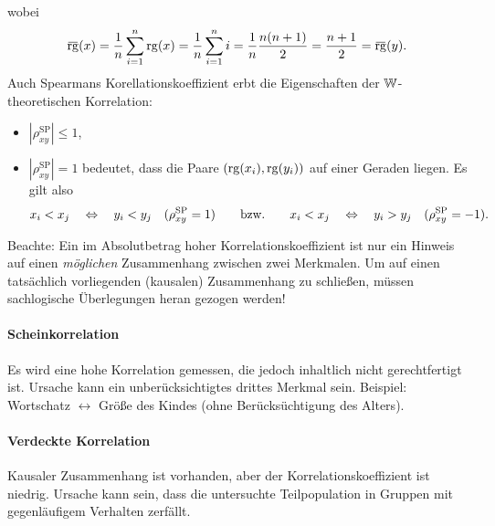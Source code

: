 wobei
\[ \obar{\rg}(x) = \rez{n} \sum_{i=1}^n \rg(x) = \rez{n} \sum_{i=1}^n i =
  \rez{n} \frac{n(n+1)}{2} = \frac{n+1}{2} = \obar{\rg}(y). \]
Auch Spearmans Korellationskoeffizient erbt die Eigenschaften der
$\mathbb{W}$-theoretischen Korrelation:
\begin{itemize}
\item $|\rho_{xy}^{\mathrm{SP}}| \le 1$,
\item $| \rho_{xy}^{\mathrm{SP}} | = 1$ bedeutet, dass die Paare $(\operatorname{rg}(x_i),
  \operatorname{rg}(y_i))$ auf einer Geraden liegen. Es gilt also
  \[ x_i < x_j \quad \Leftrightarrow \quad y_i < y_j \quad (\rho_{xy}^{\mathrm{SP}} = 1)
    \qquad \text{bzw.} \qquad
    x_i < x_j \quad \Leftrightarrow \quad y_i > y_j \quad (\rho_{xy}^{\mathrm{SP}} = -1). \]
\end{itemize}
Beachte: Ein im Absolutbetrag hoher Korrelationskoeffizient ist nur ein Hinweis
auf einen \emph{möglichen} Zusammenhang zwischen zwei Merkmalen. Um auf einen
tatsächlich vorliegenden (kausalen) Zusammenhang zu schließen, müssen
sachlogische Überlegungen heran gezogen werden!

\paragraph{Scheinkorrelation}
Es wird eine hohe Korrelation gemessen, die jedoch inhaltlich nicht
gerechtfertigt ist. Ursache kann ein unberücksichtigtes drittes Merkmal sein.
Beispiel: Wortschatz $\leftrightarrow$ Größe des Kindes (ohne Berücksüchtigung
des Alters).

\paragraph{Verdeckte Korrelation}
Kausaler Zusammenhang ist vorhanden, aber der Korrelationskoeffizient ist
niedrig. Ursache kann sein, dass die untersuchte Teilpopulation in Gruppen mit
gegenläufigem Verhalten zerfällt.
